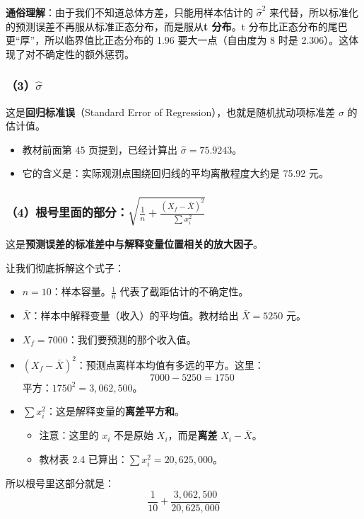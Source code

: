 \documentclass[12pt,a4paper]{article}
\begin{document}
\textbf{通俗理解}：由于我们不知道总体方差，只能用样本估计的 \(\hat{\sigma}^2\) 来代替，所以标准化的预测误差不再服从标准正态分布，而是服从\textbf{t 分布}。t 分布比正态分布的尾巴更“厚”，所以临界值比正态分布的 1.96 要大一点（自由度为 8 时是 2.306）。这体现了对不确定性的额外惩罚。

\subsubsection*{（3）\(\hat{\sigma}\)}
这是\textbf{回归标准误}（Standard Error of Regression），也就是随机扰动项标准差 \(\sigma\) 的估计值。
\begin{itemize}
\item 教材前面第 45 页提到，已经计算出 \(\hat{\sigma} = 75.9243\)。
\item 它的含义是：实际观测点围绕回归线的平均离散程度大约是 75.92 元。
\end{itemize}

\subsubsection*{（4）根号里面的部分：\(\sqrt{ \frac{1}{n} + \frac{(X_f - \bar{X})^2}{\sum x_i^2} }\)}

这是\textbf{预测误差的标准差中与解释变量位置相关的放大因子}。

让我们彻底拆解这个式子：

\begin{itemize}
\item \(n = 10\)：样本容量。\(\frac{1}{n}\) 代表了截距估计的不确定性。
\item \(\bar{X}\)：样本中解释变量（收入）的平均值。教材给出 \(\bar{X} = 5250\) 元。
\item \(X_f = 7000\)：我们要预测的那个收入值。
\item \((X_f - \bar{X})^2\)：预测点离样本均值有多远的平方。这里：
  \[
  7000 - 5250 = 1750
  \]
  平方：\(1750^2 = 3,062,500\)。
\item \(\sum x_i^2\)：这是解释变量的\textbf{离差平方和}。
  \begin{itemize}
  \item 注意：这里的 \(x_i\) 不是原始 \(X_i\)，而是\textbf{离差} \(X_i - \bar{X}\)。
  \item 教材表 2.4 已算出：\(\sum x_i^2 = 20,625,000\)。
  \end{itemize}
\end{itemize}

所以根号里这部分就是：
\[
\frac{1}{10} + \frac{3,062,500}{20,625,000}
\]
\end{document}
